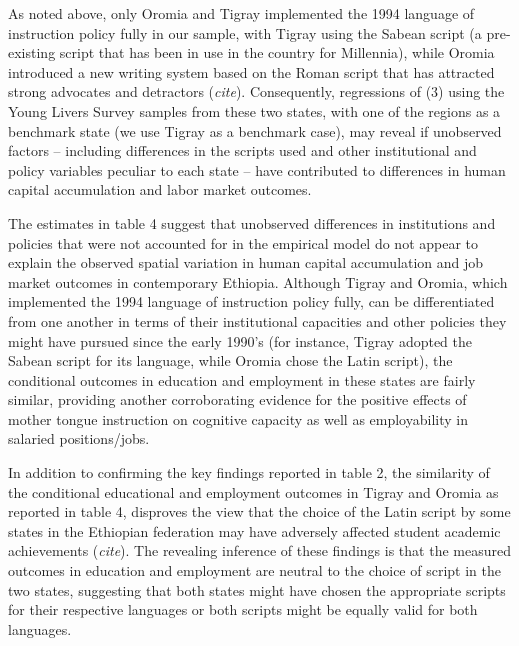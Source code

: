 As noted above, only Oromia and Tigray implemented the 1994 language of instruction policy fully in our sample, with Tigray using the Sabean script (a pre-existing script that has been in use in the country for Millennia), while Oromia introduced a new writing system based on the Roman script that has attracted strong advocates and detractors (\textit{cite}). Consequently, regressions of (3) using the Young Livers Survey samples from these two states, with one of the regions as a benchmark state (we use Tigray as a benchmark case), may reveal if unobserved factors – including differences in the scripts used and other institutional and policy variables peculiar to each state – have contributed to differences in human capital accumulation and labor market outcomes. 

The estimates in table 4 suggest that unobserved differences in institutions and policies that were not accounted for in the empirical model do not appear to explain the observed spatial variation in human capital accumulation and job market outcomes in contemporary Ethiopia.  Although Tigray and Oromia, which implemented the 1994 language of instruction policy fully, can be differentiated from one another in terms of their institutional capacities and other policies they might have pursued since the early 1990’s (for instance, Tigray adopted the Sabean script for its language, while Oromia chose the Latin script), the conditional outcomes in education and employment in these states are fairly similar, providing another corroborating evidence for the positive effects of mother tongue instruction on cognitive capacity as well as employability in salaried positions/jobs. 

In addition to confirming the key findings reported in table 2, the similarity of the conditional educational and employment outcomes in Tigray and Oromia as reported in table 4, disproves the view that the choice of the Latin script by some states in the Ethiopian federation may have adversely affected student academic achievements (\textit{cite}). The revealing inference of these findings is that the measured outcomes in education and employment are neutral to the choice of script in the two states, suggesting that both states might have chosen the appropriate scripts for their respective languages or both scripts might be equally valid for both languages. 











